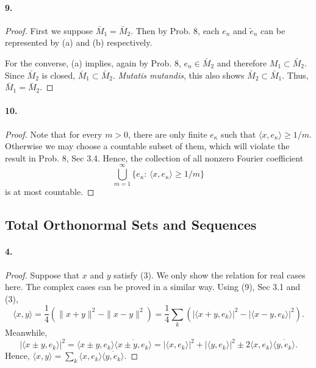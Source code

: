  \paragraph{9.}
  \begin{proof}
    First we suppose $\bar{M}_1=\bar{M}_2$. Then by Prob. 8, each $e_n$ and
    $\tilde{e}_n$ can be represented by (a) and (b) respectively.\par
    For the converse, (a) implies, again by Prob. 8, $e_n\in\bar{M}_2$ and
    therefore $M_1\subset\bar{M}_2$. Since $\bar{M}_2$ is closed, $\bar{M}_1
    \subset\bar{M}_2$. \textit{Mutatis mutandis}, this also shows $\bar{M}_2
    \subset\bar{M}_1$. Thus, $\bar{M}_1=\bar{M}_2$.
  \end{proof}
  
  \paragraph{10.}
  \begin{proof}
    Note that for every $m>0$, there are only finite $e_\kappa$ such that $
    \langle x,e_\kappa\rangle\ge 1/m$. Otherwise we may choose a countable
    subset of them, which will violate the result in Prob. 8, Sec 3.4. Hence,
    the collection of all nonzero Fourier coefficient
    \[
      \bigcup_{m=1}^\infty\{ e_\kappa:\, \langle x,e_\kappa\rangle\ge 1/m \}
    \]
    is at most countable.
  \end{proof}

\subsection{Total Orthonormal Sets and Sequences}
  \paragraph{4.}
  \begin{proof}
    Suppose that $x$ and $y$ satisfy (3). We only show the relation for real 
    cases here. The complex cases can be proved in a similar way. Using (9),
    Sec 3.1 and (3),
    \[
      \langle x,y\rangle = \frac{1}{4}(\|x+y\|^2-\|x-y\|^2) =
      \frac{1}{4}\sum_k
      \left(|\langle x+y,e_k\rangle|^2-|\langle x-y,e_k\rangle|^2 \right).
    \]
    Meanwhile,
    \[
      |\langle x\pm y,e_k\rangle|^2=
      \langle x\pm y,e_k\rangle\overline{\langle x\pm y,e_k\rangle}=
      |\langle x,e_k\rangle|^2+|\langle y,e_k\rangle|^2\pm
      2\langle x,e_k\rangle\overline{\langle y,e_k\rangle}.
    \]
    Hence, $\langle x,y\rangle=\sum_k\langle x,e_k\rangle\overline{\langle
    y,e_k\rangle}$.
  \end{proof}
  
